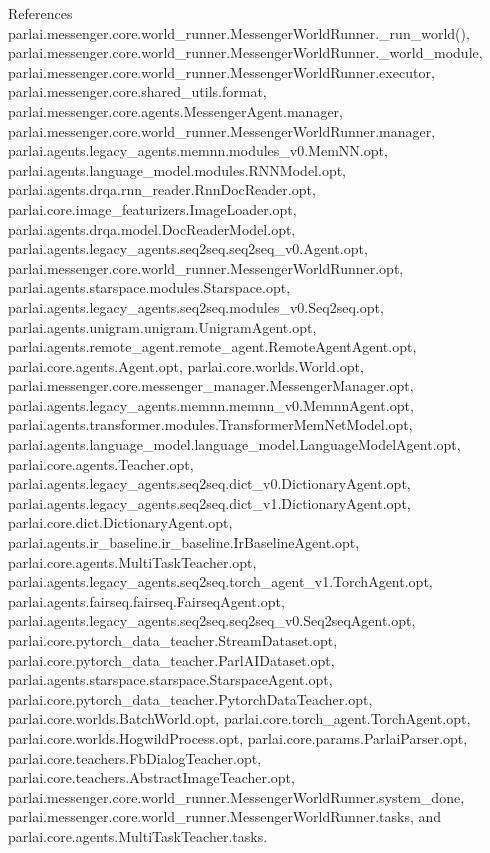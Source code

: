References parlai.\+messenger.\+core.\+world\+\_\+runner.\+Messenger\+World\+Runner.\+\_\+run\+\_\+world(), parlai.\+messenger.\+core.\+world\+\_\+runner.\+Messenger\+World\+Runner.\+\_\+world\+\_\+module, parlai.\+messenger.\+core.\+world\+\_\+runner.\+Messenger\+World\+Runner.\+executor, parlai.\+messenger.\+core.\+shared\+\_\+utils.\+format, parlai.\+messenger.\+core.\+agents.\+Messenger\+Agent.\+manager, parlai.\+messenger.\+core.\+world\+\_\+runner.\+Messenger\+World\+Runner.\+manager, parlai.\+agents.\+legacy\+\_\+agents.\+memnn.\+modules\+\_\+v0.\+Mem\+N\+N.\+opt, parlai.\+agents.\+language\+\_\+model.\+modules.\+R\+N\+N\+Model.\+opt, parlai.\+agents.\+drqa.\+rnn\+\_\+reader.\+Rnn\+Doc\+Reader.\+opt, parlai.\+core.\+image\+\_\+featurizers.\+Image\+Loader.\+opt, parlai.\+agents.\+drqa.\+model.\+Doc\+Reader\+Model.\+opt, parlai.\+agents.\+legacy\+\_\+agents.\+seq2seq.\+seq2seq\+\_\+v0.\+Agent.\+opt, parlai.\+messenger.\+core.\+world\+\_\+runner.\+Messenger\+World\+Runner.\+opt, parlai.\+agents.\+starspace.\+modules.\+Starspace.\+opt, parlai.\+agents.\+legacy\+\_\+agents.\+seq2seq.\+modules\+\_\+v0.\+Seq2seq.\+opt, parlai.\+agents.\+unigram.\+unigram.\+Unigram\+Agent.\+opt, parlai.\+agents.\+remote\+\_\+agent.\+remote\+\_\+agent.\+Remote\+Agent\+Agent.\+opt, parlai.\+core.\+agents.\+Agent.\+opt, parlai.\+core.\+worlds.\+World.\+opt, parlai.\+messenger.\+core.\+messenger\+\_\+manager.\+Messenger\+Manager.\+opt, parlai.\+agents.\+legacy\+\_\+agents.\+memnn.\+memnn\+\_\+v0.\+Memnn\+Agent.\+opt, parlai.\+agents.\+transformer.\+modules.\+Transformer\+Mem\+Net\+Model.\+opt, parlai.\+agents.\+language\+\_\+model.\+language\+\_\+model.\+Language\+Model\+Agent.\+opt, parlai.\+core.\+agents.\+Teacher.\+opt, parlai.\+agents.\+legacy\+\_\+agents.\+seq2seq.\+dict\+\_\+v0.\+Dictionary\+Agent.\+opt, parlai.\+agents.\+legacy\+\_\+agents.\+seq2seq.\+dict\+\_\+v1.\+Dictionary\+Agent.\+opt, parlai.\+core.\+dict.\+Dictionary\+Agent.\+opt, parlai.\+agents.\+ir\+\_\+baseline.\+ir\+\_\+baseline.\+Ir\+Baseline\+Agent.\+opt, parlai.\+core.\+agents.\+Multi\+Task\+Teacher.\+opt, parlai.\+agents.\+legacy\+\_\+agents.\+seq2seq.\+torch\+\_\+agent\+\_\+v1.\+Torch\+Agent.\+opt, parlai.\+agents.\+fairseq.\+fairseq.\+Fairseq\+Agent.\+opt, parlai.\+agents.\+legacy\+\_\+agents.\+seq2seq.\+seq2seq\+\_\+v0.\+Seq2seq\+Agent.\+opt, parlai.\+core.\+pytorch\+\_\+data\+\_\+teacher.\+Stream\+Dataset.\+opt, parlai.\+core.\+pytorch\+\_\+data\+\_\+teacher.\+Parl\+A\+I\+Dataset.\+opt, parlai.\+agents.\+starspace.\+starspace.\+Starspace\+Agent.\+opt, parlai.\+core.\+pytorch\+\_\+data\+\_\+teacher.\+Pytorch\+Data\+Teacher.\+opt, parlai.\+core.\+worlds.\+Batch\+World.\+opt, parlai.\+core.\+torch\+\_\+agent.\+Torch\+Agent.\+opt, parlai.\+core.\+worlds.\+Hogwild\+Process.\+opt, parlai.\+core.\+params.\+Parlai\+Parser.\+opt, parlai.\+core.\+teachers.\+Fb\+Dialog\+Teacher.\+opt, parlai.\+core.\+teachers.\+Abstract\+Image\+Teacher.\+opt, parlai.\+messenger.\+core.\+world\+\_\+runner.\+Messenger\+World\+Runner.\+system\+\_\+done, parlai.\+messenger.\+core.\+world\+\_\+runner.\+Messenger\+World\+Runner.\+tasks, and parlai.\+core.\+agents.\+Multi\+Task\+Teacher.\+tasks.

